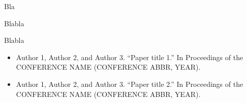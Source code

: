 \vita
\begin{singlespace}
    \begin{description}[labelwidth=4cm,leftmargin=4.2cm,itemsep=1em]

        \item[NAME] Bla

        \item[EDUCATION] Blabla

        \item[SOMETHING] Blabla

        \item[PUBLICATIONS]
            \begin{itemize}[label={},listparindent=0pt,itemindent=0pt,leftmargin=0pt,itemsep=1em,parsep=0pt,topsep=0pt,partopsep=0pt]

                \item Author 1, Author 2, and Author 3. %
                ``Paper title 1.'' %
                In Proceedings of the CONFERENCE NAME (CONFERENCE ABBR, YEAR).

                \item Author 1, Author 2, and Author 3. %
                ``Paper title 2.'' %
                In Proceedings of the CONFERENCE NAME (CONFERENCE ABBR, YEAR).

            \end{itemize}
    \end{description}
\end{singlespace}
